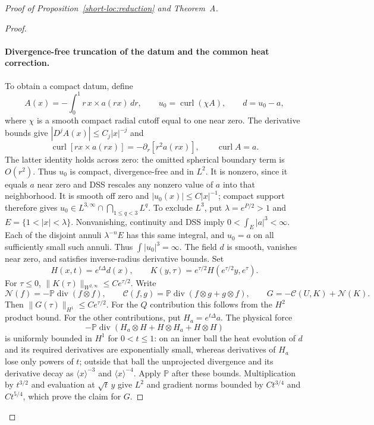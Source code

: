 \begin{proof}[Proof of Proposition~\ref{short-loc:reduction} and Theorem~A]
\begin{proof}
\paragraph{Divergence-free truncation of the datum and the common heat correction.}
To obtain a compact datum, define
\[
 A(x)=-\int_0^1r\,x\times a(rx)\,dr,
 \qquad u_0=\operatorname{curl}(\chi A),\qquad d=u_0-a,
\]
where $\chi$ is a smooth compact radial cutoff equal to one near zero.
The derivative bounds give $|D^jA(x)|\le C_j|x|^{-j}$ and
\[
 \operatorname{curl}[r x\times a(rx)]
       =-\partial_r[r^2a(rx)],\qquad \operatorname{curl}A=a.
\]
The latter identity holds across zero: the omitted spherical boundary
term is $O(r^2)$. Thus $u_0$ is compact, divergence-free and in $L^2$.
It is nonzero, since it equals $a$ near zero and DSS rescales any
nonzero value of $a$ into that neighborhood. It is smooth off zero and
$|u_0(x)|\le C|x|^{-1}$; compact support therefore gives
$u_0\in L^{3,\infty}\cap\bigcap_{1\le q<3}L^q$.
To exclude $L^3$, put $\lambda=e^{P/2}>1$ and
$E=\{1<|x|<\lambda\}$. Nonvanishing, continuity and DSS imply
$0<\int_E|a|^3<\infty$. Each of the disjoint annuli $\lambda^{-n}E$
has this same integral, and $u_0=a$ on all sufficiently small such
annuli. Thus $\int|u_0|^3=\infty$.
The field $d$ is smooth,
vanishes near zero, and satisfies inverse-radius derivative bounds.
Set
\[
 H(x,t)=e^{t\Delta}d(x),\qquad
 K(y,\tau)=e^{\tau/2}H(e^{\tau/2}y,e^\tau).
\]
For $\tau\le0$, $\|K(\tau)\|_{W^{2,\infty}}\le Ce^{\tau/2}$.
Write
\[
 \mathcal N(f)=-\mathbb P\operatorname{div}(f\otimes f),\qquad
 \mathcal C(f,g)=\mathbb P\operatorname{div}(f\otimes g+g\otimes f),
 \qquad G=-\mathcal C(U,K)+\mathcal N(K).
\]
Then $\|G(\tau)\|_{H^1}\le Ce^{\tau/2}$. For the $Q$ contribution
this follows from the $H^2$ product bound. For the other contributions,
put $H_a=e^{t\Delta}a$. The physical force
\[
 -\mathbb P\operatorname{div}(H_a\otimes H+H\otimes H_a+H\otimes H)
\]
is uniformly bounded in $H^1$ for $0<t\le1$: on an inner ball the
heat evolution of $d$ and its required derivatives are exponentially
small, whereas derivatives of $H_a$ lose only powers of $t$; outside
that ball the unprojected divergence and its derivative decay as
$\langle x\rangle^{-3}$ and $\langle x\rangle^{-4}$. Apply
$\mathbb P$ after these bounds. Multiplication by $t^{3/2}$ and
evaluation at $\sqrt t\,y$ give $L^2$ and gradient norms bounded by
$Ct^{3/4}$ and $Ct^{5/4}$, which prove the claim for $G$.


\end{proof}
\end{proof}
